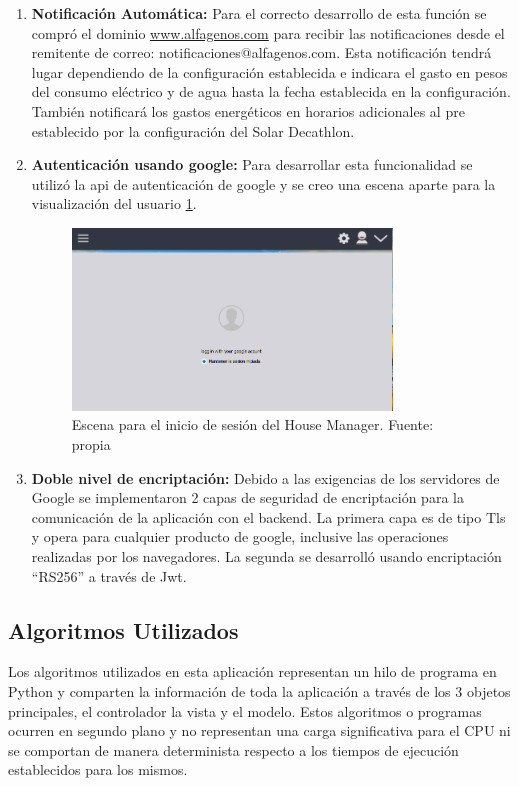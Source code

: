 \begin{enumerate}
	\item \textbf{Notificación Automática:} Para el correcto desarrollo de esta función se compró el dominio \href{www.alfagenos.com}{www.alfagenos.com} para recibir las notificaciones desde el remitente de correo: notificaciones@alfagenos.com. Esta notificación tendrá lugar dependiendo de la configuración establecida e indicara el gasto en pesos del consumo eléctrico y de agua hasta la fecha establecida en la configuración. También notificará los gastos  energéticos en horarios adicionales al pre establecido por la configuración del Solar Decathlon.
	
	\item\textbf{Autenticación usando google:} Para desarrollar esta funcionalidad se utilizó la api de autenticación de google y se creo una escena aparte para la visualización del usuario \ref{fig_11}.
	\begin{figure}[htbp]
		\centerline{\includegraphics[width=8.5cm]{figuras/housemanager_user.png}}
		\caption{Escena para el inicio de sesión del House Manager. Fuente: propia}
		\label{fig_11}
	\end{figure}
	
	\item \textbf{Doble nivel de encriptación:} Debido a las exigencias de los servidores de Google se implementaron 2 capas de seguridad de encriptación para la  comunicación de la aplicación con el backend. La primera capa es de tipo Tls y opera para cualquier producto de google, inclusive las operaciones realizadas por los navegadores. La segunda se desarrolló usando encriptación ``RS256'' a través de Jwt.
\end{enumerate}

\subsection{Algoritmos Utilizados}

Los algoritmos utilizados en esta aplicación representan un hilo de programa en Python y comparten la información de toda la aplicación a través de los 3 objetos principales, el controlador la vista y el modelo. Estos algoritmos o programas ocurren en segundo plano y no representan una carga significativa para el CPU ni se comportan de manera determinista respecto a los tiempos de ejecución establecidos para los mismos.

